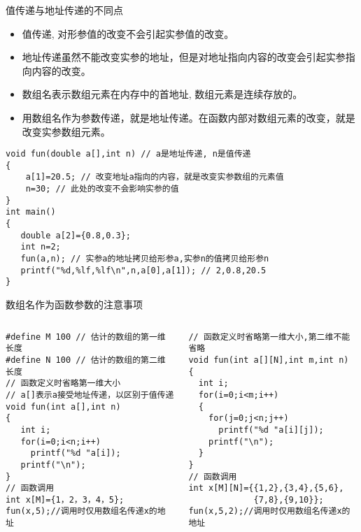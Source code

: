 \begin{frame}{值传递与地址传递的不同点}
\begin{itemize}
	\item 值传递, 对形参值的改变不会引起实参值的改变。
	\item 地址传递虽然不能改变实参的地址，但是对地址指向内容的改变会引起实参指向内容的改变。
	\item 数组名表示数组元素在内存中的首地址, 数组元素是连续存放的。
	\item 用数组名作为参数传递，就是地址传递。在函数内部对数组元素的改变，就是改变实参数组元素。
\end{itemize}
\begin{lstlisting}
void fun(double a[],int n) // a是地址传递, n是值传递
{
    a[1]=20.5; // 改变地址a指向的内容，就是改变实参数组的元素值
    n=30; // 此处的改变不会影响实参的值
}
int main()
{
   double a[2]={0.8,0.3};
   int n=2;
   fun(a,n); // 实参a的地址拷贝给形参a,实参n的值拷贝给形参n
   printf("%d,%lf,%lf\n",n,a[0],a[1]); // 2,0.8,20.5
}
\end{lstlisting}
\end{frame}

\begin{frame}{数组名作为函数参数的注意事项}
\begin{columns}[T]
\begin{lstlisting}
#define M 100 // 估计的数组的第一维长度
#define N 100 // 估计的数组的第二维长度
// 函数定义时省略第一维大小
// a[]表示a接受地址传递，以区别于值传递
void fun(int a[],int n)
{
   int i;
   for(i=0;i<n;i++) 
     printf("%d "a[i]);
   printf("\n");
}
// 函数调用
int x[M]={1，2，3，4，5};
fun(x,5);//调用时仅用数组名传递x的地址
\end{lstlisting}
\begin{lstlisting}
// 函数定义时省略第一维大小,第二维不能省略
void fun(int a[][N],int m,int n)
{
  int i;
  for(i=0;i<m;i++)
  {
    for(j=0;j<n;j++) 
      printf("%d "a[i][j]);
    printf("\n");
  }
}
// 函数调用
int x[M][N]={{1,2},{3,4},{5,6},
             {7,8},{9,10}};
fun(x,5,2);//调用时仅用数组名传递x的地址
\end{lstlisting}
\end{columns}
~\\
\end{frame}

